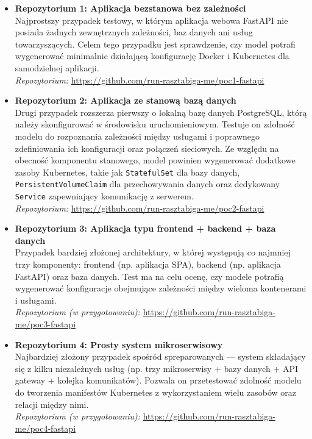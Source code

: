 \begin{itemize}
    \item \textbf{Repozytorium 1: Aplikacja bezstanowa bez zależności}\\
    Najprostszy przypadek testowy, w którym aplikacja webowa FastAPI nie posiada żadnych zewnętrznych zależności, baz danych ani usług towarzyszących. Celem tego przypadku jest sprawdzenie, czy model potrafi wygenerować minimalnie działającą konfigurację Docker i Kubernetes dla samodzielnej aplikacji.\\
    \textit{Repozytorium:} \url{https://github.com/run-rasztabiga-me/poc1-fastapi}

    \item \textbf{Repozytorium 2: Aplikacja ze stanową bazą danych}\\
    Drugi przypadek rozszerza pierwszy o lokalną bazę danych PostgreSQL, którą należy skonfigurować w środowisku uruchomieniowym. Testuje on zdolność modelu do rozpoznania zależności między usługami i poprawnego zdefiniowania ich konfiguracji oraz połączeń sieciowych. Ze względu na obecność komponentu stanowego, model powinien wygenerować dodatkowe zasoby Kubernetes, takie jak \texttt{StatefulSet} dla bazy danych, \texttt{PersistentVolumeClaim} dla przechowywania danych oraz dedykowany \texttt{Service} zapewniający komunikację z serwerem.\\
    \textit{Repozytorium:} \url{https://github.com/run-rasztabiga-me/poc2-fastapi}

    \item \textbf{Repozytorium 3: Aplikacja typu frontend + backend + baza danych}\\
    Przypadek bardziej złożonej architektury, w której występują co najmniej trzy komponenty: frontend (np. aplikacja SPA), backend (np. aplikacja FastAPI) oraz baza danych. Test ma na celu ocenę, czy modele potrafią wygenerować konfiguracje obejmujące zależności między wieloma kontenerami i usługami.\\
    \textit{Repozytorium (w przygotowaniu):} \url{https://github.com/run-rasztabiga-me/poc3-fastapi}

    \item \textbf{Repozytorium 4: Prosty system mikroserwisowy}\\
    Najbardziej złożony przypadek spośród spreparowanych — system składający się z kilku niezależnych usług (np. trzy mikroserwisy + bazy danych + API gateway + kolejka komunikatów). Pozwala on przetestować zdolność modelu do tworzenia manifestów Kubernetes z wykorzystaniem wielu zasobów oraz relacji między nimi.\\
    \textit{Repozytorium (w przygotowaniu):} \url{https://github.com/run-rasztabiga-me/poc4-fastapi}
\end{itemize}


